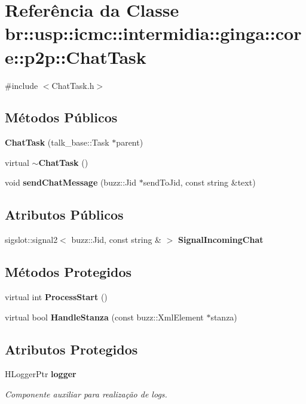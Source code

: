 \section{Referência da Classe br::usp::icmc::intermidia::ginga::core::p2p::ChatTask}
\label{classbr_1_1usp_1_1icmc_1_1intermidia_1_1ginga_1_1core_1_1p2p_1_1ChatTask}


{\ttfamily \#include $<$ChatTask.h$>$}

\subsection*{Métodos Públicos}
\begin{DoxyCompactItemize}
\item 
{\bf ChatTask} (talk\_\-base::Task $\ast$parent)
\item 
virtual {\bf $\sim$ChatTask} ()
\item 
void {\bf sendChatMessage} (buzz::Jid $\ast$sendToJid, const string \&text)
\end{DoxyCompactItemize}
\subsection*{Atributos Públicos}
\begin{DoxyCompactItemize}
\item 
sigslot::signal2$<$ buzz::Jid, const string \& $>$ {\bf SignalIncomingChat}
\end{DoxyCompactItemize}
\subsection*{Métodos Protegidos}
\begin{DoxyCompactItemize}
\item 
virtual int {\bfseries ProcessStart} ()\label{classbr_1_1usp_1_1icmc_1_1intermidia_1_1ginga_1_1core_1_1p2p_1_1ChatTask_a0c62b48a707d1f844e9c50f5e8865a58}

\item 
virtual bool {\bfseries HandleStanza} (const buzz::XmlElement $\ast$stanza)\label{classbr_1_1usp_1_1icmc_1_1intermidia_1_1ginga_1_1core_1_1p2p_1_1ChatTask_ae3fcb7b611b6cc69ec0852bbc593381a}

\end{DoxyCompactItemize}
\subsection*{Atributos Protegidos}
\begin{DoxyCompactItemize}
\item 
HLoggerPtr {\bf logger}\label{classbr_1_1usp_1_1icmc_1_1intermidia_1_1ginga_1_1core_1_1p2p_1_1ChatTask_a05fc7c4045c19a95b582fa4d5b82c011}

\begin{DoxyCompactList}\small\item\em Componente auxiliar para realização de logs. \item\end{DoxyCompactList}\end{DoxyCompactItemize}


